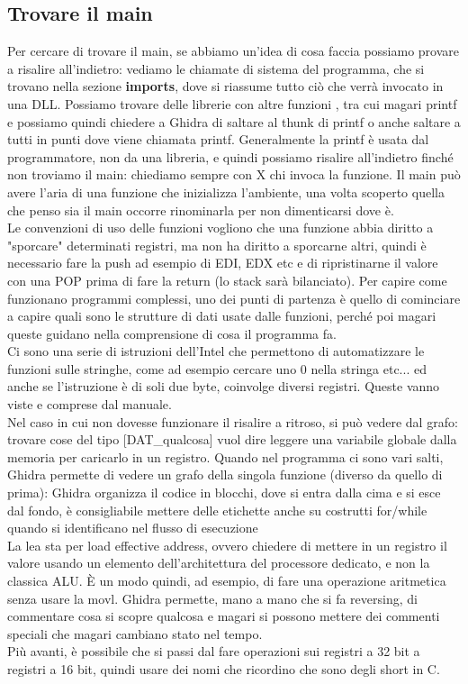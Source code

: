 \documentclass[12pt, oneside]{extbook}
\begin{document}
\subsection{Trovare il main}
Per cercare di trovare il main, se abbiamo un'idea di cosa faccia possiamo provare a risalire all'indietro: vediamo le chiamate di sistema del programma, che si trovano nella sezione \textbf{imports}, dove si riassume tutto ciò che verrà invocato in una DLL. Possiamo trovare delle librerie con altre funzioni , tra cui magari printf e possiamo quindi chiedere a Ghidra di saltare al thunk di printf o anche saltare a tutti in punti dove viene chiamata printf. Generalmente la printf è usata dal programmatore, non da una libreria, e quindi possiamo risalire all'indietro finché non troviamo il main: chiediamo sempre con X chi invoca la funzione. Il main può avere l'aria di una funzione che inizializza l'ambiente, una volta scoperto quella che penso sia il main occorre rinominarla per non dimenticarsi dove è.\\ Le convenzioni di uso delle funzioni vogliono che una funzione abbia diritto a "sporcare" determinati registri, ma non ha diritto a sporcarne altri, quindi è necessario fare la push ad esempio di EDI, EDX etc e di ripristinarne il valore con una POP prima di fare la return (lo stack sarà bilanciato). Per capire come funzionano programmi complessi, uno dei punti di partenza è quello di cominciare a capire quali sono le strutture di dati usate dalle funzioni, perché poi magari queste guidano nella comprensione di cosa il programma fa.\\ Ci sono una serie di istruzioni dell'Intel che permettono di automatizzare le funzioni sulle stringhe, come ad esempio cercare uno 0 nella stringa etc... ed anche se l'istruzione è di soli due byte, coinvolge diversi registri. Queste vanno viste e comprese dal manuale.\\ Nel caso in cui non dovesse funzionare il risalire a ritroso, si può vedere dal grafo:\\ trovare cose del tipo [DAT\_qualcosa] vuol dire leggere una variabile globale dalla memoria per caricarlo in un registro. Quando nel programma ci sono vari salti, Ghidra permette di vedere un grafo della singola funzione (diverso da quello di prima): Ghidra organizza il codice in blocchi, dove si entra dalla cima e si esce dal fondo, è consigliabile mettere delle etichette anche su costrutti for/while quando si identificano nel flusso di esecuzione\\ La \textsf{lea} sta per load effective address, ovvero chiedere di mettere in un registro il valore usando un elemento dell'architettura del processore dedicato, e non la classica ALU. È un modo quindi, ad esempio, di fare una operazione aritmetica senza usare la movl. Ghidra permette, mano a mano che si fa reversing, di commentare cosa si scopre qualcosa e magari si possono mettere dei commenti speciali che magari cambiano stato nel tempo.\\ Più avanti, è possibile che si passi dal fare operazioni sui registri a 32 bit a registri a 16 bit, quindi usare dei nomi che ricordino che sono degli short in C.
\end{document}
